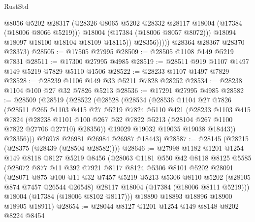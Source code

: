 \begin{lexlean}{RustStd}
\begin{coremodule}
                      @8056
                      @5202
                      @28317
                      (@28326 @8065 @5202 @28332 @28117 @18004 (@17384 (@18006 @8066 @5219)))
                      @18004
                      (@17384 (@18006 @8057 @8072)))
                    @18094
                    @18097
                    @18100
                    @18104
                    @18109
                    @18115))
                @28356)))))
      @28364
      @28367
      @28370
      @28373)
@28505 := @17505 @27995
@28509 := @28505 @1108 @149 @5219 @7831
@28511 := @17300 @27995 @4985
@28519 := @28511 @919 @1107 @1497 @149 @5219 @7829 @5110 @1506
@28522 := @28233 @1107 @1497 @7829
@28528 := @28239 @1106 @149 @33 @5211 @7828 @28252
@28534 := @28238 @1104 @100 @27 @32 @7826 @5213
@28536 := @17291 @27995 @4985
@28582 := @28509
    (@28519
      (@28522
        (@28528
          (@28534
            (@28536
              @1104
              @27
              @7826
              (@28511
                @265
                @1103
                @415
                @27
                @5219
                @7824
                @5110
                @421
                (@28233
                  @1103
                  @415
                  @7824
                  (@28238
                    @1101
                    @100
                    @267
                    @32
                    @7822
                    @5213
                    (@28104 @267 @1100 @7822 @27706 @27710)
                    @28356))
                @19029
                @19032
                @19035
                @19038
                @18443))
            @28356)))
      @26978
      @26981
      @26984
      @26987
      @18443)
@28587 := @28145 (@28215 (@28375 (@28439 (@28504 @28582))))
@28646 := @27998
    @1182
    @1201
    @1254
    @149
    @8118
    @8127
    @5219
    @8456
    (@28063
      @1181
      @550
      @42
      @8118
      @8125
      @5585
      (@28072
        @877
        @11
        @392
        @7921
        @8117
        @8124
        @5306
        @8101
        @5202
        @28091
        (@28071
          @875
          @100
          @11
          @32
          @7457
          @5219
          @5213
          @5306
          @8110
          @5202
          (@28105 @874 @7457 @26544 @26548)
          @28117
          @18004
          (@17384 (@18006 @8111 @5219)))
        @18004
        (@17384 (@18006 @8102 @8117)))
      @18890
      @18893
      @18896
      @18900
      @18905
      @18911)
@28654 := @28044 @8127 @1201 @1254 @149 @8148 @8202 @8224 @8454

\end{coremodule}
\end{lexlean}
